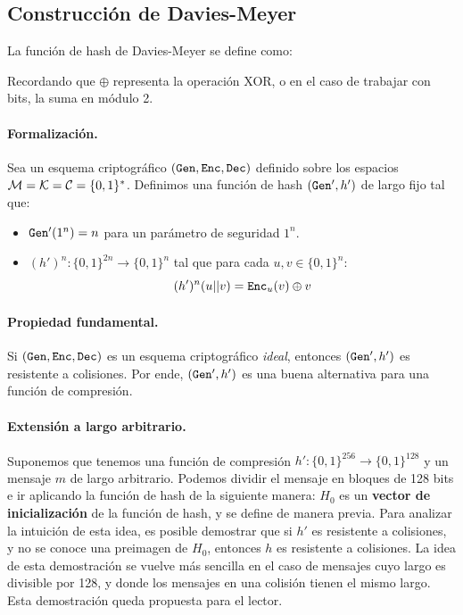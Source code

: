 \subsection{Construcción de Davies-Meyer}
La función de hash de Davies-Meyer se define como:

Recordando que $\oplus$ representa la operación XOR, o en el caso de trabajar con bits, la suma en módulo 2.

\paragraph{Formalización.} Sea un esquema criptográfico $(\texttt{Gen}, \texttt{Enc}, \texttt{Dec})$ definido sobre los espacios $\mathcal{M} = \mathcal{K} = \mathcal{C} = \{0,1\}^*$. Definimos una función de hash $(\texttt{Gen}', h')$ de largo fijo tal que:
\begin{itemize}
    \item $\texttt{Gen}'(1^n) = n$ para un parámetro de seguridad $1^n$.
    \item $(h')^n:\{0,1\}^{2n} \to \{0,1\}^n$ tal que para cada $u,v \in \{0,1\}^n$:
    $$
    (h')^n(u||v) = \texttt{Enc}_u(v) \oplus v
    $$
\end{itemize}

\paragraph{Propiedad fundamental.} Si $(\texttt{Gen}, \texttt{Enc}, \texttt{Dec})$ es un esquema criptográfico \textit{ideal}, entonces $(\texttt{Gen}', h')$ es resistente a colisiones. Por ende, $(\texttt{Gen}', h')$ es una buena alternativa para una función de compresión.

\paragraph{Extensión a largo arbitrario.} Suponemos que tenemos una función de compresión $h':\{0,1\}^{256} \to \{0,1\}^{128}$ y un mensaje $m$ de largo arbitrario. Podemos dividir el mensaje en bloques de 128 bits e ir aplicando la función de hash de la siguiente manera:
$H_0$ es un \textbf{vector de inicialización} de la función de hash, y se define de manera previa. Para analizar la intuición de esta idea, es posible demostrar que si $h'$ es resistente a colisiones, y no se conoce una preimagen de $H_0$, entonces $h$ es resistente a colisiones. La idea de esta demostración se vuelve más sencilla en el caso de mensajes cuyo largo es divisible por 128, y donde los mensajes en una colisión tienen el mismo largo. Esta demostración queda propuesta para el lector.

